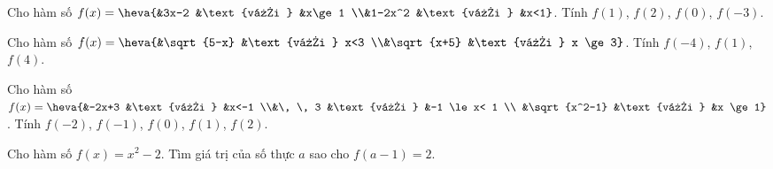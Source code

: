 \begin{vd}%
	Cho hàm số $f(x)=\heva{&3x-2 &\text{với } &x\ge 1 \\&1-2x^2 &\text{với } &x<1}$. Tính $f(1)$, $f(2)$, $f(0)$, $f(-3)$.
\end{vd}
\begin{vd}%
	Cho hàm số $f(x)=\heva{&\sqrt{5-x} &\text{với } x<3 \\&\sqrt{x+5} &\text{với } x \ge 3}$. Tính $f(-4)$, $f(1)$, $f(4)$.
\end{vd}
\begin{vd}%
	Cho hàm số $f(x)=\heva{&-2x+3 &\text{với } &x<-1 \\&\, \, 3 &\text{với } &-1 \le x< 1 \\ &\sqrt{x^2-1} &\text{với } &x \ge 1}$.	Tính $f(-2)$, $f(-1)$, $f(0)$, $f(1)$, $f(2)$.
\end{vd}
\begin{vd}%
	Cho hàm số $f(x)=x^2-2$. Tìm giá trị của số thực $a$ sao cho $f(a-1)=2$.
\end{vd}
